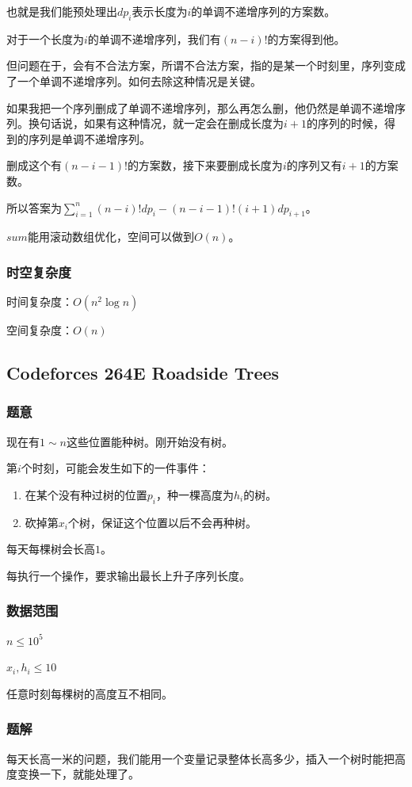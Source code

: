 \documentclass{ctexart}
\begin{document}
也就是我们能预处理出$dp_i$表示长度为$i$的单调不递增序列的方案数。

对于一个长度为$i$的单调不递增序列，我们有$(n-i)!$的方案得到他。

但问题在于，会有不合法方案，所谓不合法方案，指的是某一个时刻里，序列变成了一个单调不递增序列。如何去除这种情况是关键。

如果我把一个序列删成了单调不递增序列，那么再怎么删，他仍然是单调不递增序列。换句话说，如果有这种情况，就一定会在删成长度为$i+1$的序列的时候，得到的序列是单调不递增序列。

删成这个有$(n-i-1)!$的方案数，接下来要删成长度为$i$的序列又有$i+1$的方案数。

所以答案为$\sum\limits_{i=1}^n (n-i)!dp_i-(n-i-1)!(i+1)dp_{i+1}$。

$sum$能用滚动数组优化，空间可以做到$O(n)$。
\subsubsection{时空复杂度}
时间复杂度：$O(n^2 \log n)$

空间复杂度：$O(n)$
\subsection{Codeforces 264E Roadside Trees}
\subsubsection{题意}
现在有$1 \sim n$这些位置能种树。刚开始没有树。

第$i$个时刻，可能会发生如下的一件事件：

\begin{enumerate}
\item 在某个没有种过树的位置$p_i$，种一棵高度为$h_i$的树。
\item 砍掉第$x_i$个树，保证这个位置以后不会再种树。
\end{enumerate}

每天每棵树会长高$1$。

每执行一个操作，要求输出最长上升子序列长度。
\subsubsection{数据范围}
$n \le 10^5$

$x_i,h_i \le 10$

任意时刻每棵树的高度互不相同。
\subsubsection{题解}
每天长高一米的问题，我们能用一个变量记录整体长高多少，插入一个树时能把高度变换一下，就能处理了。
\end{document}
